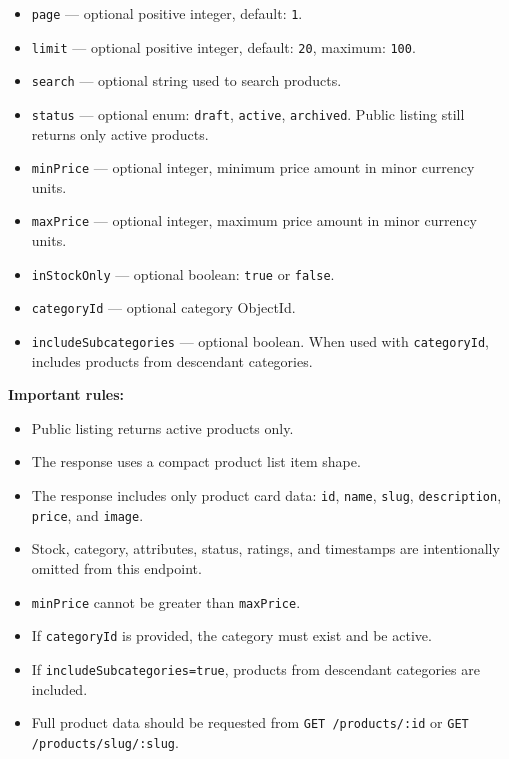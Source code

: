 \begin{itemize}
    \item \texttt{page} --- optional positive integer, default: \texttt{1}.
    \item \texttt{limit} --- optional positive integer, default: \texttt{20}, maximum: \texttt{100}.
    \item \texttt{search} --- optional string used to search products.
    \item \texttt{status} --- optional enum: \texttt{draft}, \texttt{active}, \texttt{archived}. Public listing still returns only active products.
    \item \texttt{minPrice} --- optional integer, minimum price amount in minor currency units.
    \item \texttt{maxPrice} --- optional integer, maximum price amount in minor currency units.
    \item \texttt{inStockOnly} --- optional boolean: \texttt{true} or \texttt{false}.
    \item \texttt{categoryId} --- optional category ObjectId.
    \item \texttt{includeSubcategories} --- optional boolean. When used with \texttt{categoryId}, includes products from descendant categories.
\end{itemize}

\textbf{Important rules:}

\begin{itemize}
    \item Public listing returns active products only.
    \item The response uses a compact product list item shape.
    \item The response includes only product card data: \texttt{id}, \texttt{name}, \texttt{slug}, \texttt{description}, \texttt{price}, and \texttt{image}.
    \item Stock, category, attributes, status, ratings, and timestamps are intentionally omitted from this endpoint.
    \item \texttt{minPrice} cannot be greater than \texttt{maxPrice}.
    \item If \texttt{categoryId} is provided, the category must exist and be active.
    \item If \texttt{includeSubcategories=true}, products from descendant categories are included.
    \item Full product data should be requested from \texttt{GET /products/:id} or \texttt{GET /products/slug/:slug}.
\end{itemize}

